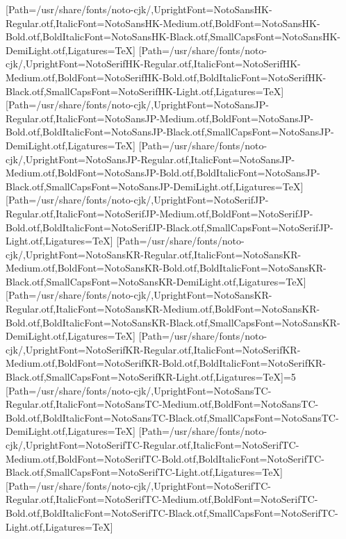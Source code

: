 \newfontfamily{}[Path=/usr/share/fonts/noto-cjk/,UprightFont=NotoSansHK-Regular.otf,ItalicFont=NotoSansHK-Medium.otf,BoldFont=NotoSansHK-Bold.otf,BoldItalicFont=NotoSansHK-Black.otf,SmallCapsFont=NotoSansHK-DemiLight.otf,Ligatures=TeX]
\newfontfamily{}[Path=/usr/share/fonts/noto-cjk/,UprightFont=NotoSerifHK-Regular.otf,ItalicFont=NotoSerifHK-Medium.otf,BoldFont=NotoSerifHK-Bold.otf,BoldItalicFont=NotoSerifHK-Black.otf,SmallCapsFont=NotoSerifHK-Light.otf,Ligatures=TeX]
\newfontfamily{}[Path=/usr/share/fonts/noto-cjk/,UprightFont=NotoSansJP-Regular.otf,ItalicFont=NotoSansJP-Medium.otf,BoldFont=NotoSansJP-Bold.otf,BoldItalicFont=NotoSansJP-Black.otf,SmallCapsFont=NotoSansJP-DemiLight.otf,Ligatures=TeX]
\newfontfamily{}[Path=/usr/share/fonts/noto-cjk/,UprightFont=NotoSansJP-Regular.otf,ItalicFont=NotoSansJP-Medium.otf,BoldFont=NotoSansJP-Bold.otf,BoldItalicFont=NotoSansJP-Black.otf,SmallCapsFont=NotoSansJP-DemiLight.otf,Ligatures=TeX]
\newfontfamily{}[Path=/usr/share/fonts/noto-cjk/,UprightFont=NotoSerifJP-Regular.otf,ItalicFont=NotoSerifJP-Medium.otf,BoldFont=NotoSerifJP-Bold.otf,BoldItalicFont=NotoSerifJP-Black.otf,SmallCapsFont=NotoSerifJP-Light.otf,Ligatures=TeX]
\newfontfamily{}[Path=/usr/share/fonts/noto-cjk/,UprightFont=NotoSansKR-Regular.otf,ItalicFont=NotoSansKR-Medium.otf,BoldFont=NotoSansKR-Bold.otf,BoldItalicFont=NotoSansKR-Black.otf,SmallCapsFont=NotoSansKR-DemiLight.otf,Ligatures=TeX]
\newfontfamily{}[Path=/usr/share/fonts/noto-cjk/,UprightFont=NotoSansKR-Regular.otf,ItalicFont=NotoSansKR-Medium.otf,BoldFont=NotoSansKR-Bold.otf,BoldItalicFont=NotoSansKR-Black.otf,SmallCapsFont=NotoSansKR-DemiLight.otf,Ligatures=TeX]
\newfontfamily{}[Path=/usr/share/fonts/noto-cjk/,UprightFont=NotoSerifKR-Regular.otf,ItalicFont=NotoSerifKR-Medium.otf,BoldFont=NotoSerifKR-Bold.otf,BoldItalicFont=NotoSerifKR-Black.otf,SmallCapsFont=NotoSerifKR-Light.otf,Ligatures=TeX]\else\ifnum\value{NotoCJKFamily}=5
\newfontfamily{}[Path=/usr/share/fonts/noto-cjk/,UprightFont=NotoSansTC-Regular.otf,ItalicFont=NotoSansTC-Medium.otf,BoldFont=NotoSansTC-Bold.otf,BoldItalicFont=NotoSansTC-Black.otf,SmallCapsFont=NotoSansTC-DemiLight.otf,Ligatures=TeX]
\newfontfamily{}[Path=/usr/share/fonts/noto-cjk/,UprightFont=NotoSerifTC-Regular.otf,ItalicFont=NotoSerifTC-Medium.otf,BoldFont=NotoSerifTC-Bold.otf,BoldItalicFont=NotoSerifTC-Black.otf,SmallCapsFont=NotoSerifTC-Light.otf,Ligatures=TeX]
\newfontfamily{}[Path=/usr/share/fonts/noto-cjk/,UprightFont=NotoSerifTC-Regular.otf,ItalicFont=NotoSerifTC-Medium.otf,BoldFont=NotoSerifTC-Bold.otf,BoldItalicFont=NotoSerifTC-Black.otf,SmallCapsFont=NotoSerifTC-Light.otf,Ligatures=TeX]
